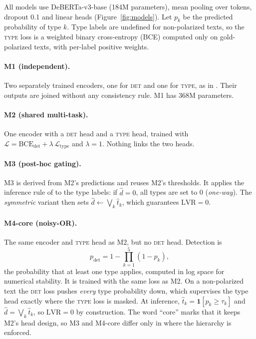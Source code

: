 \documentclass[11pt]{article}
\newcommand{\DET}{\textsc{det}}
\newcommand{\TYPE}{\textsc{type}}
\newcommand{\LVR}{\mathrm{LVR}}
\begin{document}
All models use DeBERTa-v3-base \citep{he2023debertav3} (184M parameters),
mean pooling over tokens, dropout 0.1 and linear heads
(Figure~\ref{fig:models}). Let $p_k$ be the predicted probability of type
$k$. Type labels are undefined for non-polarized texts, so the \TYPE{} loss
is a weighted binary cross-entropy (BCE) computed only on gold-polarized
texts, with per-label positive weights.

\paragraph{M1 (independent).}
Two separately trained encoders, one for \DET{} and one for \TYPE{}, as in
\citet{guo-chang-2026-yeze}. Their outputs are joined without any
consistency rule. M1 has 368M parameters.

\paragraph{M2 (shared multi-task).}
One encoder with a \DET{} head and a \TYPE{} head, trained with
$\mathcal L = \mathrm{BCE}_{\text{det}} + \lambda\,\mathcal L_{\text{type}}$
and $\lambda=1$. Nothing links the two heads.

\paragraph{M3 (post-hoc gating).}
M3 is derived from M2's predictions and reuses M2's thresholds. It applies
the inference rule of \citet{maharjan-etal-2026-sagarmatha} to the type
labels: if $\hat d = 0$, all types are set to 0 (\emph{one-way}). The
\emph{symmetric} variant then sets $\hat d \leftarrow \bigvee_k \hat t_k$,
which guarantees $\LVR = 0$.

\paragraph{M4-core (noisy-OR).}
The same encoder and \TYPE{} head as M2, but no \DET{} head. Detection is
\begin{equation}
p_{\text{det}} = 1-\textstyle\prod_{k=1}^{5}(1-p_k),
\label{eq:noisyor}
\end{equation}
the probability that at least one type applies, computed in log space for
numerical stability. It is trained with the same loss as M2. On a
non-polarized text the \DET{} loss pushes \emph{every} type probability
down, which supervises the type head exactly where the \TYPE{} loss is
masked. At inference, $\hat t_k = \mathbf 1[p_k \ge \tau_k]$ and
$\hat d = \bigvee_k \hat t_k$, so $\LVR = 0$ by construction. The word
``core'' marks that it keeps M2's head design, so M3 and M4-core differ only
in where the hierarchy is enforced.
\end{document}
